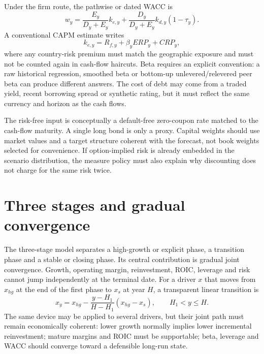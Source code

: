 Under the firm route, the pathwise or dated WACC is
\begin{equation}
w_y=\frac{E_y}{D_y+E_y}k_{e,y}
  +\frac{D_y}{D_y+E_y}k_{d,y}(1-\tau_y).
\end{equation}
A conventional CAPM estimate writes
\begin{equation}
k_{e,y}=R_{f,y}+\beta_y ERP_y+CRP_y,
\end{equation}
where any country-risk premium must match the geographic exposure and must not
be counted again in cash-flow haircuts. Beta requires an explicit convention:
a raw historical regression, smoothed beta or bottom-up unlevered/relevered
peer beta can produce different answers. The cost of debt may come from a
traded yield, recent borrowing spread or synthetic rating, but it must reflect
the same currency and horizon as the cash flows.

The risk-free input is conceptually a default-free zero-coupon rate matched to
the cash-flow maturity. A single long bond is only a proxy. Capital weights
should use market values and a target structure coherent with the forecast,
not book weights selected for convenience. If option-implied risk is already
embedded in the scenario distribution, the measure policy must also explain
why discounting does not charge for the same risk twice.

\section{Three stages and gradual convergence}

The three-stage model separates a high-growth or explicit phase, a transition
phase and a stable or closing phase. Its central contribution is gradual joint
convergence. Growth, operating margin, reinvestment, ROIC, leverage and risk
cannot jump independently at the terminal date. For a driver \(x\) that moves
from \(x_{hg}\) at the end of the first phase to \(x_s\) at year \(H\), a
transparent linear transition is
\begin{equation}
x_y=x_{hg}-\frac{y-H_1}{H-H_1}(x_{hg}-x_s),
\qquad H_1<y\leq H.
\end{equation}
The same device may be applied to several drivers, but their joint path must
remain economically coherent: lower growth normally implies lower incremental
reinvestment; mature margins and ROIC must be supportable; beta, leverage and
WACC should converge toward a defensible long-run state.


